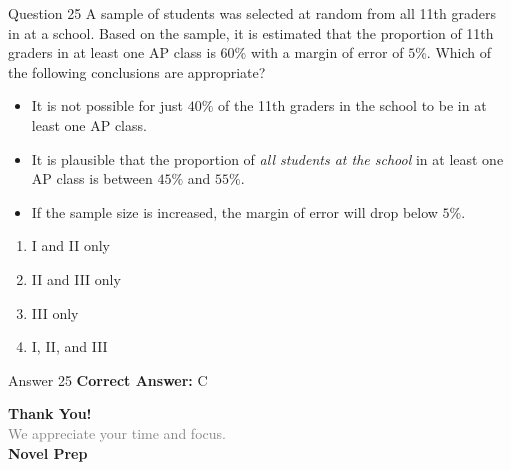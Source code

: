 \documentclass{beamer}
\begin{document}
\begin{frame}{Question 25}
\small
A sample of students was selected at random from all 11th graders in at a school. 
Based on the sample, it is estimated that the proportion of 11th graders in at least one AP class is $60\%$ with a margin of error of $5\%$. 
Which of the following conclusions are appropriate?

\begin{itemize}
\item[I.] It is not possible for just $40\%$ of the 11th graders in the school to be in at least one AP class.
\item[II.] It is plausible that the proportion of \emph{all students at the school} in at least one AP class is between $45\%$ and $55\%$.
\item[III.] If the sample size is increased, the margin of error will drop below $5\%$.
\end{itemize}
\vspace{0.35cm}
\begin{enumerate}
    \item[A.] I and II only
    \item[B.] II and III only
    \item[C.] III only
    \item[D.] I, II, and III
\end{enumerate}
\end{frame}
\begin{frame}{Answer 25}
\small
\textbf{Correct Answer:} C
\end{frame}

\begin{frame}{}
    \centering
    \vspace{5em}
    {\Huge \textbf{\textcolor{novelPurple}{Thank You!}}} \\[1em]
    {\large \textcolor{gray}{We appreciate your time and focus.}} \\[3em]
    {\LARGE \textbf{\textcolor{novelPurple}{\textsf{Novel Prep}}}}
    \vfill
\end{frame}
\end{document}
